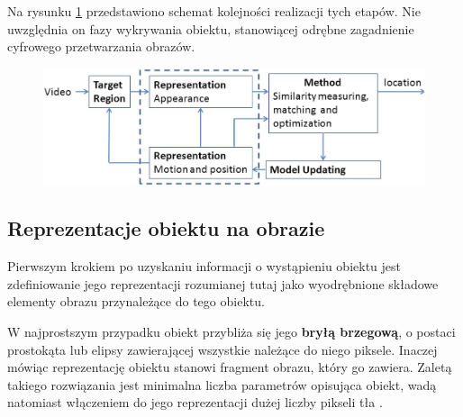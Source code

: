 Na rysunku \ref{fig:Ogolny_model_dzialania_algorytmow_wizyjnego_sledzenia_obiektow} przedstawiono schemat kolejności realizacji tych etapów. Nie uwzględnia on fazy wykrywania obiektu, stanowiącej odrębne zagadnienie cyfrowego przetwarzania obrazów.

\begin{figure}[!htb]
	\begin{center}
		\includegraphics[width=12cm]{images/object_trackers_reference_model.png}
	\end{center}	
\label{fig:Ogolny_model_dzialania_algorytmow_wizyjnego_sledzenia_obiektow}
\end{figure}

\subsection{Reprezentacje obiektu na obrazie}
\label{subsec:Reprezentacje_obiektu_na_obrazie}

Pierwszym krokiem po uzyskaniu informacji o wystąpieniu obiektu jest zdefiniowanie jego reprezentacji rozumianej tutaj jako wyodrębnione składowe elementy obrazu przynależące do tego obiektu.

W najprostszym przypadku obiekt przybliża się jego \textbf{bryłą brzegową}, o postaci prostokąta lub elipsy zawierającej wszystkie należące do niego piksele. Inaczej mówiąc reprezentację obiektu stanowi fragment obrazu, który go zawiera. Zaletą takiego rozwiązania jest minimalna liczba parametrów opisująca obiekt, wadą natomiast włączeniem do jego reprezentacji dużej liczby pikseli tła \cite{Smeulders2010}.

